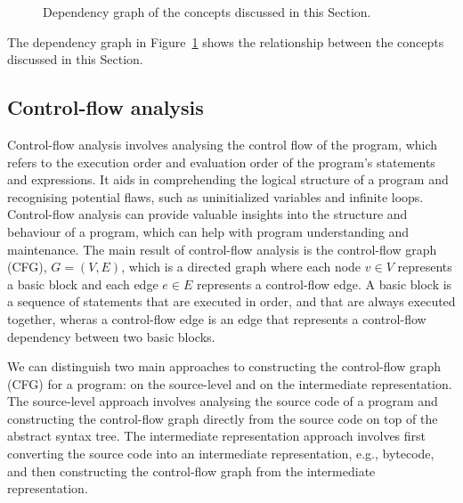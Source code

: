 \begin{figure}[h]
{}
  \caption{\label{fig:dependencygraph}Dependency graph of the concepts discussed in this Section.}
\end{figure}
The dependency graph in Figure~\ref{fig:dependencygraph} shows the relationship between 
the concepts discussed in this Section.

\subsection{Control-flow analysis}

Control-flow analysis involves analysing the control flow of the program, which refers
to the execution order and evaluation order of the program's statements and expressions.
It aids in comprehending the logical structure of a program and recognising potential flaws,
such as uninitialized variables and infinite loops. Control-flow analysis
can provide valuable insights into the structure and behaviour of a program,
which can help with program understanding and maintenance.
The main result of control-flow analysis is the control-flow graph (CFG), $G = (V, E)$,
which is a directed graph where each node $v \in V$ represents a basic block
and each edge $e \in E$ represents a control-flow edge. A basic block is a sequence of
statements that are executed in order, and that are always executed together, 
wheras a control-flow edge is an edge that represents a control-flow dependency between two basic blocks.

We can distinguish two main approaches to constructing the control-flow graph (CFG) for a program:
on the source-level and on the intermediate representation. The source-level approach
involves analysing the source code of a program and constructing the control-flow graph
directly from the source code on top of the abstract syntax tree. The intermediate representation approach involves
first converting the source code into an intermediate representation, e.g., bytecode,
and then constructing the control-flow graph from the intermediate representation.

